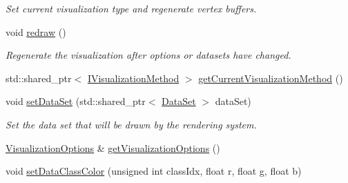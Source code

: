 \begin{DoxyCompactItemize}
\begin{DoxyCompactList}\small\item\em Set current visualization type and regenerate vertex buffers. \end{DoxyCompactList}\item 
void \hyperlink{class_lots_of_lines_1_1_rendering_system_a0ec96584510ae431d4536546beec87a1}{redraw} ()\hypertarget{class_lots_of_lines_1_1_rendering_system_a0ec96584510ae431d4536546beec87a1}{}\label{class_lots_of_lines_1_1_rendering_system_a0ec96584510ae431d4536546beec87a1}

\begin{DoxyCompactList}\small\item\em Regenerate the visualization after options or datasets have changed. \end{DoxyCompactList}\item 
std\+::shared\+\_\+ptr$<$ \hyperlink{class_lots_of_lines_1_1_i_visualization_method}{I\+Visualization\+Method} $>$ \hyperlink{class_lots_of_lines_1_1_rendering_system_aaf5b71cb1255e860deae0130cae49d10}{get\+Current\+Visualization\+Method} ()
\item 
void \hyperlink{class_lots_of_lines_1_1_rendering_system_abed36ac71876d41bef1a46e7855a2845}{set\+Data\+Set} (std\+::shared\+\_\+ptr$<$ \hyperlink{class_lots_of_lines_1_1_data_set}{Data\+Set} $>$ data\+Set)\hypertarget{class_lots_of_lines_1_1_rendering_system_abed36ac71876d41bef1a46e7855a2845}{}\label{class_lots_of_lines_1_1_rendering_system_abed36ac71876d41bef1a46e7855a2845}

\begin{DoxyCompactList}\small\item\em Set the data set that will be drawn by the rendering system. \end{DoxyCompactList}\item 
\hyperlink{class_lots_of_lines_1_1_visualization_options}{Visualization\+Options} \& \hyperlink{class_lots_of_lines_1_1_rendering_system_a74e541573c4d8301772c75c2ffae1bd1}{get\+Visualization\+Options} ()
\item 
void \hyperlink{class_lots_of_lines_1_1_rendering_system_a2fed18fe29b240103b533aabca36f2db}{set\+Data\+Class\+Color} (unsigned int class\+Idx, float r, float g, float b)\hypertarget{class_lots_of_lines_1_1_rendering_system_a2fed18fe29b240103b533aabca36f2db}{}\label{class_lots_of_lines_1_1_rendering_system_a2fed18fe29b240103b533aabca36f2db}


\end{DoxyCompactItemize}
